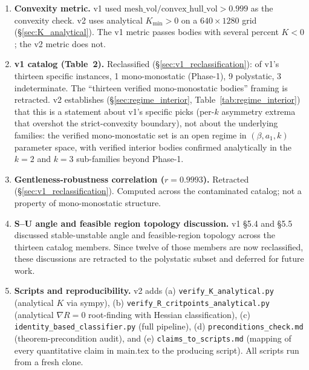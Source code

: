\documentclass[11pt,a4paper]{article}
\begin{document}
\begin{enumerate}[nosep,leftmargin=*]
\item \textbf{Convexity metric.} v1 used
  $\text{mesh\_vol}/\text{convex\_hull\_vol} > 0.999$ as the
  convexity check. v2 uses analytical $K_{\min} > 0$ on a
  $640\times1280$ grid (\S\ref{sec:K_analytical}). The v1 metric
  passes bodies with several percent $K<0$; the v2 metric does
  not.

\item \textbf{v1 catalog (Table~2).} Reclassified
  (\S\ref{sec:v1_reclassification}): of v1's thirteen specific
  instances, 1 mono-monostatic (Phase-1), 9 polystatic, 3
  indeterminate. The ``thirteen verified mono-monostatic bodies''
  framing is retracted. v2 establishes (\S\ref{sec:regime_interior},
  Table~\ref{tab:regime_interior}) that this is a statement about
  v1's specific picks (per-$k$ asymmetry extrema that overshot the
  strict-convexity boundary), not about the underlying families: the
  verified mono-monostatic set is an open regime in $(\beta, a_1, k)$
  parameter space, with verified interior bodies confirmed
  analytically in the $k=2$ and $k=3$ sub-families beyond Phase-1.

\item \textbf{Gentleness-robustness correlation
  ($r = 0.9993$).} Retracted (\S\ref{sec:v1_reclassification}).
  Computed across the contaminated catalog; not a property of
  mono-monostatic structure.

\item \textbf{S--U angle and feasible region topology discussion.}
  v1 \S 5.4 and \S 5.5 discussed stable-unstable angle and
  feasible-region topology across the thirteen catalog members.
  Since twelve of those members are now reclassified, these
  discussions are retracted to the polystatic subset and deferred
  for future work.

\item \textbf{Scripts and reproducibility.} v2 adds (a)
  \texttt{verify\_K\_analytical.py} (analytical $K$ via sympy),
  (b) \texttt{verify\_R\_critpoints\_analytical.py} (analytical
  $\nabla R = 0$ root-finding with Hessian classification),
  (c) \texttt{identity\_based\_classifier.py} (full pipeline),
  (d) \texttt{preconditions\_check.md} (theorem-precondition
  audit), and (e) \texttt{claims\_to\_scripts.md} (mapping of
  every quantitative claim in main.tex to the producing script).
  All scripts run from a fresh clone.
\end{enumerate}

\end{document}
